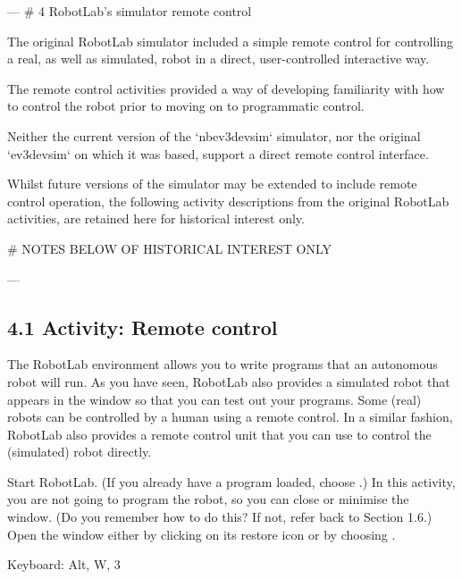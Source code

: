 \documentclass[letterpaper,10pt,english]{sphinxmanual}
\begin{document}
---
# 4 RobotLab’s simulator remote control

The original RobotLab simulator included a simple remote control for controlling a real, as well as simulated, robot in a direct, user-controlled interactive way.

The remote control activities provided a way of developing familiarity with how to control the robot prior to moving on to programmatic control.

Neither the current version of the `nbev3devsim` simulator, nor the original `ev3devsim` on which it was based, support a direct remote control interface.

Whilst future versions of the simulator may be extended to include remote control operation, the following activity descriptions from the original RobotLab activities, are retained here for historical interest only.



# NOTES BELOW OF HISTORICAL INTEREST ONLY

---


\subsection{4.1 Activity: Remote control}
\label{\detokenize{content/00_SOFTWARE_GUIDE/Section_00_04_LEGACY_UNUSED_IGNORE:4.1-Activity:-Remote-control}}\label{\detokenize{content/00_SOFTWARE_GUIDE/Section_00_04_LEGACY_UNUSED_IGNORE::doc}}
The RobotLab environment allows you to write programs that an autonomous robot will run. As you have seen, RobotLab also provides a simulated robot that appears in the  window so that you can test out your programs. Some (real) robots can be controlled by a human using a remote control. In a similar fashion, RobotLab also provides a remote control unit that you can use to control the (simulated) robot directly.

Start RobotLab. (If you already have a program loaded, choose .) In this activity, you are not going to program the robot, so you can close or minimise the  window. (Do you remember how to do this? If not, refer back to Section 1.6.) Open the  window either by clicking on its restore icon or by choosing .





Keyboard: Alt, W, 3
\end{document}
